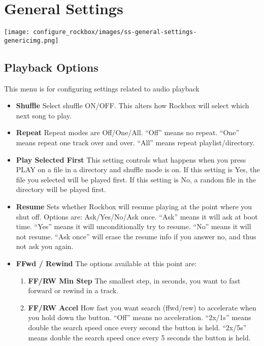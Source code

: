 \section{\label{ref:GeneralSettings}General Settings}
\begin{center}
  \texttt{[image: configure\_rockbox/images/ss-general-settings-\\genericimg.png]}
\end{center}

\subsection{\label{ref:PlaybackOptions}Playback Options}
This menu is for configuring settings related to audio playback

\begin{itemize}
\item \textbf{Shuffle}
  Select shuffle ON/OFF. This alters how Rockbox will select which next song to play.
\item \textbf{Repeat}
  Repeat modes are Off/One/All. ``Off'' means no repeat. ``One'' means repeat one track over and over. ``All'' means repeat playlist/directory. 
\item \textbf{Play Selected First}
  This setting controls what happens when you press PLAY on a file in a directory and shuffle mode is on. If this setting is Yes, the file you selected will be played first. If this setting is No, a random file in the directory will be played first.
\item \textbf{Resume}
  Sets whether Rockbox will resume playing at the point where you shut off. Options are: Ask/Yes/No/Ask once. ``Ask'' means it will ask at boot time. ``Yes'' means it will unconditionally try to resume. ``No'' means it will not resume. ``Ask once'' will erase the resume info if you answer no, and thus not ask you again.
\item \textbf{FFwd / Rewind}
  The options available at this point are:
  \begin{enumerate}
  \item \textbf{FF/RW Min Step}
    The smallest step, in seconds, you want to fast forward or rewind in a
    track.
  \item \textbf{FF/RW Accel}
    How fast you want search (ffwd/rew) to accelerate when you hold
    down the button. ``Off'' means no acceleration. ``2x/1s'' means double the
    search speed once every second the button is held. ``2x/5s'' means double the search speed once every 5 seconds the button is held.
  \end{enumerate}
  

\end{itemize}
